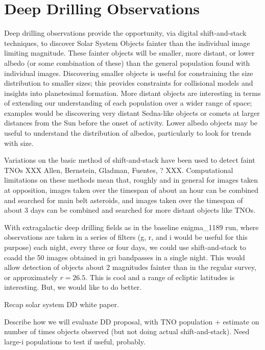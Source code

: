 
\section{Deep Drilling Observations}
\def\secname{\chpname:dd}\label{sec:\secname}

Deep drilling observations provide the opportunity, via digital
shift-and-stack techniques, to discover Solar System Objects fainter
than the individual image limiting magnitude. These fainter objects
will be smaller, more distant, or lower albedo (or some combination of these)
than the general population found with individual images. Discovering smaller
objects is useful for constraining the size distribution to smaller
sizes; this provides constraints for collisional models and insights
into planetesimal formation. More distant objects are interesting in
terms of extending our understanding of each population over a wider
range of space; examples would be discovering very distant
Sedna-like objects or comets at larger distances from the Sun before
the onset of activity. Lower albedo objects may be useful to
understand the distribution of albedos, particularly to look for
trends with size.

Variations on the basic method of shift-and-stack have been used to
detect faint TNOs XXX Allen, Bernstein, Gladman, Fuentes, ?
XXX. Computational limitations on these methods mean that, roughly
and in general for images taken at opposition, images taken over the timespan of about an hour can be
combined and searched for main belt asteroids, and images taken over
the timespan of about 3 days can be combined and searched for more
distant objects like TNOs.

With extragalactic deep drilling fields as in the baseline enigma\_1189
run, where observations are taken in a series of filters (g, r, and i
would be useful for this purpose) each night, every three or four
days, we could use shift-and-stack to coadd the 50 images obtained in
gri bandpasses in a single night. This would allow detection of
objects about 2 magnitudes fainter than in the regular survey, or
approximately $r=26.5$.  This is cool and a range of ecliptic
latitudes is interesting.  But, we would like to do better.

Recap solar system DD white paper.

Describe how we will evaluate DD proposal, with TNO population +
estimate on number of times objects observed (but not doing actual
shift-and-stack). Need large-i populations to test if useful, probably.


\navigationbar

